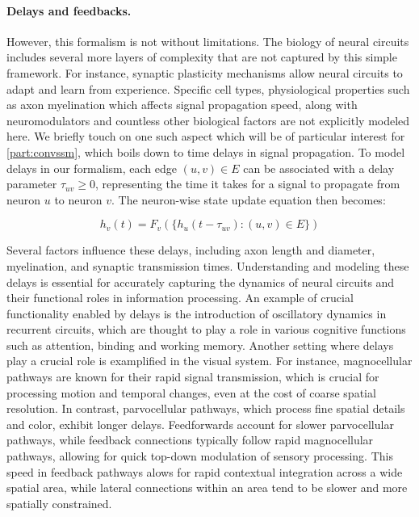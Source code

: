 \paragraph{Delays and feedbacks.} However, this formalism is not without limitations. The biology of neural circuits includes several more layers of complexity that are not captured by this simple framework. For instance, synaptic plasticity mechanisms allow neural circuits to adapt and learn from experience. Specific cell types, physiological properties such as axon myelination which affects signal propagation speed, along with neuromodulators and countless other biological factors are not explicitly modeled here. We briefly touch on one such aspect which will be of particular interest for \cref{part:convssm}, which boils down to time delays in signal propagation.
To model delays in our formalism, each edge $(u, v) \in E$ can be associated with a delay parameter $\tau_{uv} \geq 0$, representing the time it takes for a signal to propagate from neuron $u$ to neuron $v$. The neuron-wise state update equation then becomes:

\begin{equation}
    h_v(t) = F_v\left( \{ h_u(t - \tau_{uv}) : (u, v) \in E \} \right)
\end{equation}

Several factors influence these delays, including axon length and diameter, myelination, and synaptic transmission times. Understanding and modeling these delays is essential for accurately capturing the dynamics of neural circuits and their functional roles in information processing. An example of crucial functionality enabled by delays is the introduction of oscillatory dynamics in recurrent circuits, which are thought to play a role in various cognitive functions such as attention, binding and working memory. Another setting where delays play a crucial role is examplified in the visual system. For instance, magnocellular pathways are known for their rapid signal transmission, which is crucial for processing motion and temporal changes, even at the cost of coarse spatial resolution. In contrast, parvocellular pathways, which process fine spatial details and color, exhibit longer delays. Feedforwards account for slower parvocellular pathways, while feedback connections typically follow rapid magnocellular pathways, allowing for quick top-down modulation of sensory processing. This speed in feedback pathways alows for rapid contextual integration across a wide spatial area, while lateral connections within an area tend to be slower and more spatially constrained.

